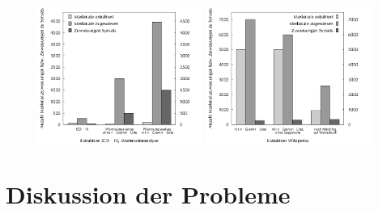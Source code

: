 \documentclass[pagesize,DIV=calc,12pt,draft]{scrreprt}
\begin{document}
\begin{figure}[!ht]
\includegraphics[width=0.48\textwidth]{icd10_affixe}
\hfill
\includegraphics[width=0.48\textwidth]{wiki_extraktion}
\end{figure}

\section{Diskussion der Probleme}
\end{document}
